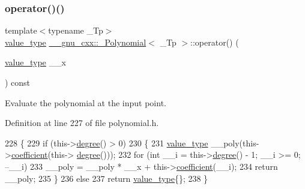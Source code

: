 \subsubsection{\texorpdfstring{operator()()}{operator()()}\hspace{0.1cm}{\footnotesize\ttfamily [2/4]}}
{\footnotesize\ttfamily template$<$typename \+\_\+\+Tp$>$ \\
\hyperlink{class____gnu__cxx_1_1__Polynomial_a725563351f50e76084a7a016c06f8a53}{value\+\_\+type} \hyperlink{class____gnu__cxx_1_1__Polynomial}{\+\_\+\+\_\+gnu\+\_\+cxx\+::\+\_\+\+Polynomial}$<$ \+\_\+\+Tp $>$\+::operator() (\begin{DoxyParamCaption}\item[{\hyperlink{class____gnu__cxx_1_1__Polynomial_a725563351f50e76084a7a016c06f8a53}{value\+\_\+type}}]{\+\_\+\+\_\+x }\end{DoxyParamCaption}) const\hspace{0.3cm}{\ttfamily [inline]}}

Evaluate the polynomial at the input point. 

Definition at line 227 of file polynomial.\+h.


\begin{DoxyCode}
228       \{
229         \textcolor{keywordflow}{if} (this->\hyperlink{class____gnu__cxx_1_1__Polynomial_a07d9933aeeb9afbd823218ed921336cb}{degree}() > 0)
230           \{
231             \hyperlink{class____gnu__cxx_1_1__Polynomial_a725563351f50e76084a7a016c06f8a53}{value\_type} \_\_poly(this->\hyperlink{class____gnu__cxx_1_1__Polynomial_a7cee31b3acbe8c024af6d696bc610f49}{coefficient}(this->
      \hyperlink{class____gnu__cxx_1_1__Polynomial_a07d9933aeeb9afbd823218ed921336cb}{degree}()));
232             \textcolor{keywordflow}{for} (\textcolor{keywordtype}{int} \_\_i = this->\hyperlink{class____gnu__cxx_1_1__Polynomial_a07d9933aeeb9afbd823218ed921336cb}{degree}() - 1; \_\_i >= 0; --\_\_i)
233               \_\_poly = \_\_poly * \_\_x + this->\hyperlink{class____gnu__cxx_1_1__Polynomial_a7cee31b3acbe8c024af6d696bc610f49}{coefficient}(\_\_i);
234             \textcolor{keywordflow}{return} \_\_poly;
235           \}
236         \textcolor{keywordflow}{else}
237           \textcolor{keywordflow}{return} \hyperlink{class____gnu__cxx_1_1__Polynomial_a725563351f50e76084a7a016c06f8a53}{value\_type}\{\};
238       \}
\end{DoxyCode}
\mbox{\label{class____gnu__cxx_1_1__Polynomial_a064c220c67f2d72104b3d4767ca5cc42}} 
